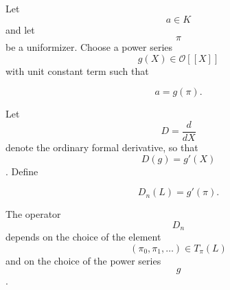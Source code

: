 Let $$a \in K$$ and let $$\pi$$ be a uniformizer. Choose a power series $$g(X) \in \mathcal{O}[\![X]\!]$$ with unit constant term such that

$$a = g(\pi).$$

Let $$D = \frac{d}{dX}$$ denote the ordinary formal derivative, so that $$D(g) = g'(X)$$. Define

$$D_n(L) = g'(\pi).$$

The operator $$D_n$$ depends on the choice of the element $$(\pi_0, \pi_1, \dots) \in T_{\pi}(L)$$ and on the choice of the power series $$g$$.
